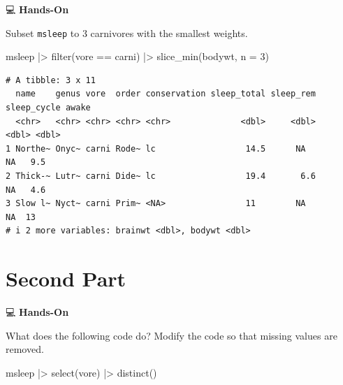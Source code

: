 \documentclass[
  letterpaper,
  DIV=11,
  numbers=noendperiod]{scrreprt}
\newenvironment{Shaded}{\begin{snugshade}}{\end{snugshade}}
\newcommand{\AttributeTok}[1]{\textcolor[rgb]{0.40,0.45,0.13}{#1}}
\newcommand{\DecValTok}[1]{\textcolor[rgb]{0.68,0.00,0.00}{#1}}
\newcommand{\FunctionTok}[1]{\textcolor[rgb]{0.28,0.35,0.67}{#1}}
\newcommand{\NormalTok}[1]{\textcolor[rgb]{0.00,0.23,0.31}{#1}}
\newcommand{\SpecialCharTok}[1]{\textcolor[rgb]{0.37,0.37,0.37}{#1}}
\newcommand{\StringTok}[1]{\textcolor[rgb]{0.13,0.47,0.30}{#1}}
\begin{document}
💻 \textbf{Hands-On}

Subset \texttt{msleep} to 3 carnivores with the smallest weights.

\begin{tcolorbox}[enhanced jigsaw, colbacktitle=quarto-callout-tip-color!10!white, opacitybacktitle=0.6, breakable, left=2mm, leftrule=.75mm, toprule=.15mm, toptitle=1mm, bottomtitle=1mm, colframe=quarto-callout-tip-color-frame, opacityback=0, coltitle=black, arc=.35mm, titlerule=0mm, colback=white, bottomrule=.15mm, title=\textcolor{quarto-callout-tip-color}{\faLightbulb}\hspace{0.5em}{Answer}, rightrule=.15mm]

\begin{Shaded}
\begin{Highlighting}[]
\NormalTok{msleep }\SpecialCharTok{|\textgreater{}} 
  \FunctionTok{filter}\NormalTok{(vore }\SpecialCharTok{==} \StringTok{\textquotesingle{}carni\textquotesingle{}}\NormalTok{) }\SpecialCharTok{|\textgreater{}}
  \FunctionTok{slice\_min}\NormalTok{(bodywt, }\AttributeTok{n =} \DecValTok{3}\NormalTok{)}
\end{Highlighting}
\end{Shaded}

\begin{verbatim}
# A tibble: 3 x 11
  name    genus vore  order conservation sleep_total sleep_rem sleep_cycle awake
  <chr>   <chr> <chr> <chr> <chr>              <dbl>     <dbl>       <dbl> <dbl>
1 Northe~ Onyc~ carni Rode~ lc                  14.5      NA            NA   9.5
2 Thick-~ Lutr~ carni Dide~ lc                  19.4       6.6          NA   4.6
3 Slow l~ Nyct~ carni Prim~ <NA>                11        NA            NA  13  
# i 2 more variables: brainwt <dbl>, bodywt <dbl>
\end{verbatim}

\end{tcolorbox}

\section{Second Part}\label{second-part}

💻 \textbf{Hands-On}

What does the following code do? Modify the code so that missing values
are removed.

\begin{Shaded}
\begin{Highlighting}[]
\NormalTok{msleep }\SpecialCharTok{|\textgreater{}}
  \FunctionTok{select}\NormalTok{(vore) }\SpecialCharTok{|\textgreater{}}
  \FunctionTok{distinct}\NormalTok{()}
\end{Highlighting}
\end{Shaded}
\end{document}
